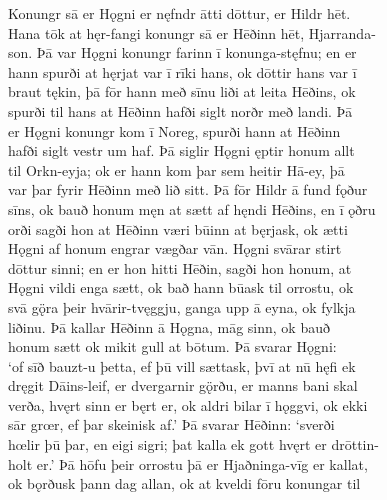 \documentclass[12pt,letterpaper]{book}
\begin{document}
\resetlinenumber
\begin{linenumbers}

Konungr sā er Hǫgni er nęfndr ātti dōttur, er Hildr hēt.\\
Hana tōk at hęr-fangi konungr sā er Hēðinn hēt, Hjarranda-\\
son.  Þā var Hǫgni konungr farinn ī konunga-stęfnu; en er\\
hann spurði at hęrjat var ī rīki hans, ok dōttir hans var ī\\
braut tękin, þā fōr hann með sīnu liði at leita Hēðins, ok\\
spurði til hans at Hēðinn hafði siglt norðr með landi.  Þā\\
er Hǫgni konungr kom ī Noreg, spurði hann at Hēðinn\\
hafði siglt vestr um haf.  Þā siglir Hǫgni ęptir honum allt\\
til Orkn-eyja; ok er hann kom þar sem heitir Hā-ey, þā\\
var þar fyrir Hēðinn með lið sitt.  Þā fōr Hildr ā fund fǫður\\
sīns, ok bauð honum męn at sætt af hęndi Hēðins, en ī ǫðru\\
orði sagði hon at Hēðinn væri būinn at bęrjask, ok ætti\\
Hǫgni af honum engrar vægðar vān.  Hǫgni svārar stirt\\
dōttur sinni; en er hon hitti Hēðin, sagði hon honum, at\\
Hǫgni vildi enga sætt, ok bað hann būask til orrostu, ok\\
svā gǫ̈ra þeir hvārir-tvęggju, ganga upp ā eyna, ok fylkja\\
liðinu.  Þā kallar Hēðinn ā Hǫgna, māg sinn, ok bauð\\
honum sætt ok mikit gull at bōtum.  Þā svarar Hǫgni:\\
`of sīð bauzt-u þetta, ef þū vill sættask, þvī at nū hęfi ek\\
dręgit Dāins-leif, er dvergarnir gǫ̈rðu, er manns bani skal\\
verða, hvęrt sinn er bęrt er, ok aldri bilar ī hǫggvi, ok ekki\\
sār grœr, ef þar skeinisk af.'  Þā svarar Hēðinn: `sverði\\
hœlir þū þar, en eigi sigri; þat kalla ek gott hvęrt er drōttin-\\
holt er.'  Þā hōfu þeir orrostu þā er Hjaðninga-vīg er kallat,\\
ok bǫrðusk þann dag allan, ok at kveldi fōru konungar til\\

\end{linenumbers}
\end{document}
